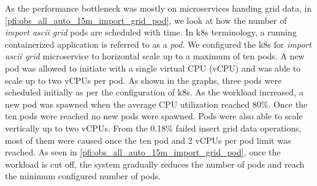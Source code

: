\documentclass[conference]{IEEEtran}
\begin{document}
As the performance bottleneck was mostly on microservices handing grid data, in \cref{pfi:obs_all_auto_15m_import_grid_pod}, we look at how the number of \textit{import ascii grid} pods are scheduled with time. In \acrshort{k8s} terminology, a running containerized application is referred to as a \emph{pod}. We configured the \acrshort{k8s} for \textit{import ascii grid} microservice to horizontal scale up to a maximum of ten pods. A new pod was allowed to initiate with a single virtual CPU (vCPU) and was able to scale up to two vCPUs per pod. As shown in the graphs, three pods were scheduled initially as per the configuration of \acrshort{k8s}. As the workload increased, a new pod was spawned when the average CPU utilization reached 80\%. Once the ten pods were reached no new pods were spawned. Pods were also able to scale vertically up to two vCPUs. From the 0.18\% failed insert grid data operations, most of them were caused once the ten pod and 2 vCPUs per pod limit was reached. As seen in  \cref{pfi:obs_all_auto_15m_import_grid_pod}, once the workload is cut off, the system gradually reduces the number of pods and reach the minimum configured number of pods.



\end{document}
